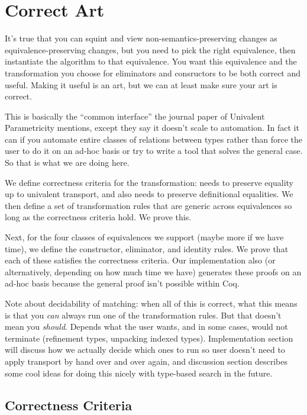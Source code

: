 \section{Correct Art}

It's true that you can squint and view non-semantics-preserving changes as equivalence-preserving changes,
but you need to pick the right equivalence, then instantiate the algorithm to that equivalence.
You want this equivalence and the transformation you choose for eliminators and consructors to be both correct and useful.
Making it useful is an art, but we can at least make sure your art is correct.

This is basically the ``common interface'' the journal paper of Univalent Parametricity mentions, except they say it
doesn't scale to automation. In fact it can if you automate entire classes of relations between types rather than
force the user to do it on an ad-hoc basis or try to write a tool that solves the general case. So that is what
we are doing here.

We define correctness criteria for the transformation: needs to preserve equality up to univalent transport, and also needs to
preserve definitional equalities.
We then define a set of transformation rules that are generic across equivalences so long as the correctness criteria hold.
We prove this.

Next, for the four classes of equivalences we support (maybe more if we have time), we define the constructor, eliminator, and identity rules.
We prove that each of these satisfies the correctness criteria.
Our implementation also (or alternatively, depending on how much time we have) generates these proofs on an ad-hoc basis because
the general proof isn't possible within Coq.

Note about decidability of matching: when all of this is correct, what this means is that you \textit{can} always
run one of the transformation rules. But that doesn't mean you \textit{should}. Depends what the user wants,
and in some cases, would not terminate (refinement types, unpacking indexed types). Implementation section will
discuss how we actually decide which ones to run so user doesn't need to apply transport by hand over and over again,
and discussion section describes some cool ideas for doing this nicely with type-based search in the future.

\subsection{Correctness Criteria}

